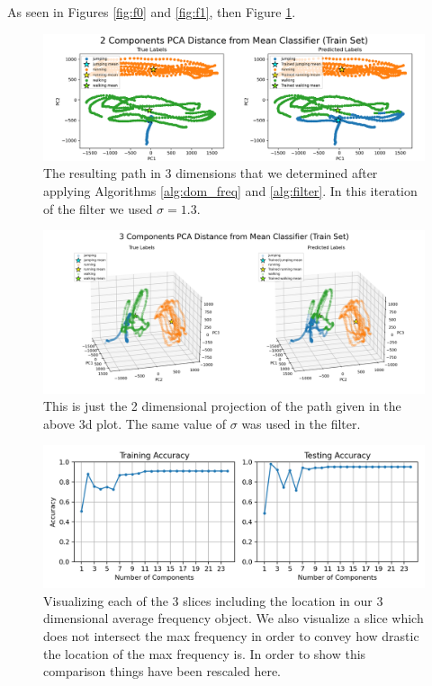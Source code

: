 \documentclass[11pt]{amsart}
\begin{document}
As seen in Figures \ref{fig:f0} and \ref{fig:f1}, then Figure \ref{fig:f2}.

\begin{figure}[h]
	\centering
	\includegraphics[width=.75\textwidth]{../visualizations/pca_distance_from_mean_classifier_2d.png}
 	\caption{The resulting path in 3 dimensions that we determined after applying Algorithms \ref{alg:dom_freq} and \ref{alg:filter}. In this iteration of the filter we used $\sigma=1.3$.}\label{fig:f2}
\end{figure}

\begin{figure}[h]
	\centering
	\includegraphics[width=.75\textwidth]{../visualizations/pca_distance_from_mean_classifier_3d.png}
 	\caption{This is just the 2 dimensional projection of the path given in the above 3d plot. The same value of $\sigma$ was used in the filter.}\label{fig:f3}
\end{figure}

\begin{figure}[h]
	\centering
	\includegraphics[width=.75\textwidth]{../visualizations/train_and_test_accuracy_by_num_components.png}
 	\caption{Visualizing each of the 3 slices including the location in our 3 dimensional average frequency object. We also visualize a slice which does not intersect the max frequency in order to convey how drastic the location of the max frequency is. In order to show this comparison things have been rescaled here.}\label{fig:f4}
\end{figure}
\end{document}

